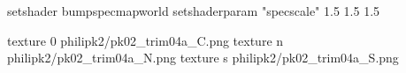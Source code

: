 setshader bumpspecmapworld
setshaderparam "specscale" 1.5 1.5 1.5

texture 0 philipk2/pk02_trim04a_C.png
texture n philipk2/pk02_trim04a_N.png
texture s philipk2/pk02_trim04a_S.png

